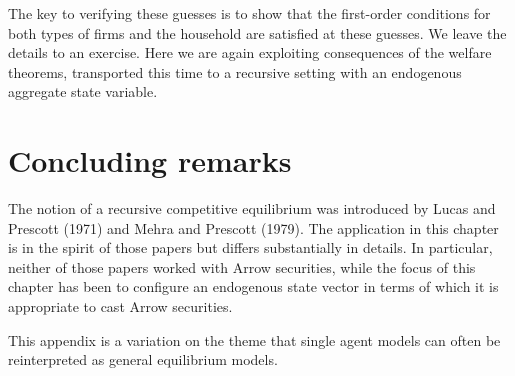 The key to verifying these guesses is to show that the first-order
conditions for both types of firms and the household are
satisfied at these guesses.  We leave the details to an exercise.
Here we are again exploiting  consequences of the welfare
theorems, transported this time to a recursive setting with an
endogenous aggregate state variable.


\section{Concluding remarks}
  The notion of a recursive competitive equilibrium was introduced
by Lucas and Prescott (1971) and Mehra and Prescott (1979).
The application in this chapter is in the spirit of those papers
but differs substantially in details.  In particular, neither of
those papers worked with Arrow securities, while the focus of this
chapter has been to configure an endogenous state vector in terms of
which it is appropriate to cast Arrow securities.

%
%
%


%

\label{sec:perm_income_ge}%
This appendix is a variation on the theme that  single agent models can often
be reinterpreted as general equilibrium models.

